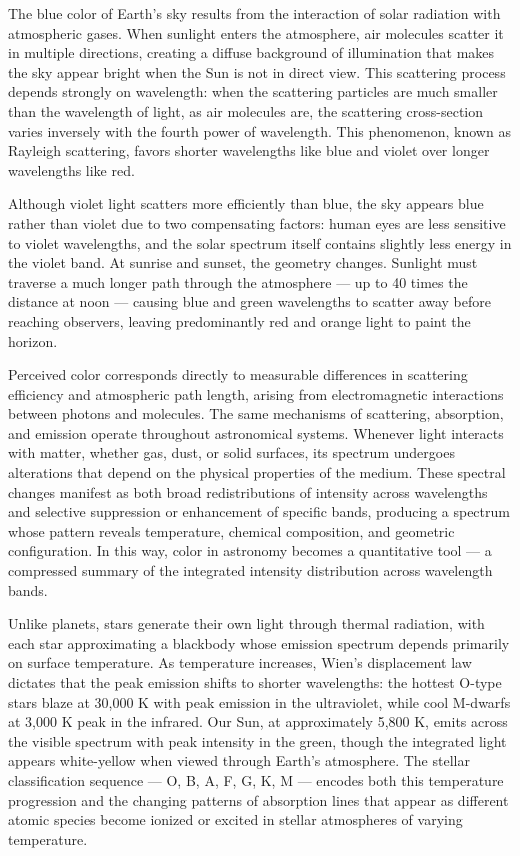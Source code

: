 The blue color of Earth's sky results from the interaction of solar radiation with atmospheric gases. When sunlight enters the atmosphere, air molecules scatter it in multiple directions, creating a diffuse background of illumination that makes the sky appear bright when the Sun is not in direct view. This scattering process depends strongly on wavelength: when the scattering particles are much smaller than the wavelength of light, as air molecules are, the scattering cross-section varies inversely with the fourth power of wavelength. This phenomenon, known as Rayleigh scattering, favors shorter wavelengths like blue and violet over longer wavelengths like red.

Although violet light scatters more efficiently than blue, the sky appears blue rather than violet due to two compensating factors: human eyes are less sensitive to violet wavelengths, and the solar spectrum itself contains slightly less energy in the violet band. At sunrise and sunset, the geometry changes. Sunlight must traverse a much longer path through the atmosphere — up to 40 times the distance at noon — causing blue and green wavelengths to scatter away before reaching observers, leaving predominantly red and orange light to paint the horizon.

Perceived color corresponds directly to measurable differences in scattering efficiency and atmospheric path length, arising from electromagnetic interactions between photons and molecules. The same mechanisms of scattering, absorption, and emission operate throughout astronomical systems. Whenever light interacts with matter, whether gas, dust, or solid surfaces, its spectrum undergoes alterations that depend on the physical properties of the medium. These spectral changes manifest as both broad redistributions of intensity across wavelengths and selective suppression or enhancement of specific bands, producing a spectrum whose pattern reveals temperature, chemical composition, and geometric configuration. In this way, color in astronomy becomes a quantitative tool — a compressed summary of the integrated intensity distribution across wavelength bands.

Unlike planets, stars generate their own light through thermal radiation, with each star approximating a blackbody whose emission spectrum depends primarily on surface temperature. As temperature increases, Wien's displacement law dictates that the peak emission shifts to shorter wavelengths: the hottest O-type stars blaze at 30,000 K with peak emission in the ultraviolet, while cool M-dwarfs at 3,000 K peak in the infrared. Our Sun, at approximately 5,800 K, emits across the visible spectrum with peak intensity in the green, though the integrated light appears white-yellow when viewed through Earth's atmosphere. The stellar classification sequence — O, B, A, F, G, K, M — encodes both this temperature progression and the changing patterns of absorption lines that appear as different atomic species become ionized or excited in stellar atmospheres of varying temperature.

